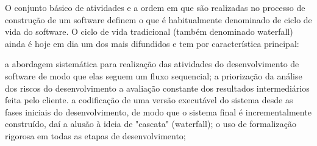 \documentclass[12pt, addpoints]{exam}
\begin{document}
\begin{questions}
O conjunto básico de atividades e a ordem em que são realizadas no processo de construção de um software definem o que é habitualmente denominado de ciclo de vida do software. O ciclo de vida tradicional (também denominado waterfall) ainda é hoje em dia um dos mais difundidos e tem por característica principal: 
\begin{choices}
\choice a abordagem sistemática para realização das atividades do desenvolvimento de software de modo que elas seguem um fluxo sequencial; 
\choice a priorização da análise dos riscos do desenvolvimento
\choice a avaliação constante dos resultados intermediários feita pelo cliente.
\choice a codificação de uma versão executável do sistema desde as fases iniciais do desenvolvimento, de modo que o sistema final é incrementalmente construído, daí a alusão à ideia de "cascata" (waterfall); 
\choice o uso de formalização rigorosa em todas as etapas de desenvolvimento; 
\end{choices}



    \end{questions}
    
\end{document}
